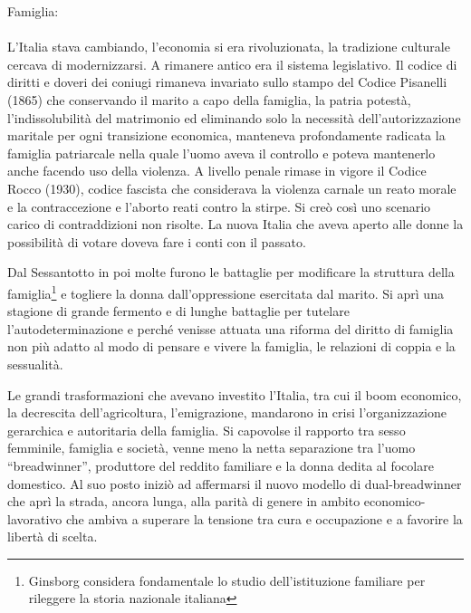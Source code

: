 Famiglia:\paragraph{} L'Italia stava cambiando, l'economia si era rivoluzionata, la tradizione culturale cercava di modernizzarsi.
A rimanere antico era il sistema legislativo.
Il codice di diritti e doveri dei coniugi rimaneva invariato sullo stampo del Codice Pisanelli (1865) che conservando il marito a capo della famiglia, la patria potestà, l'indissolubilità del matrimonio ed eliminando solo la necessità dell'autorizzazione maritale per ogni transizione economica, manteneva profondamente radicata la famiglia patriarcale nella quale l'uomo aveva il controllo e poteva mantenerlo anche facendo uso della violenza.
A livello penale rimase in vigore il Codice Rocco (1930), codice fascista che considerava la violenza carnale un reato morale e la contraccezione e l'aborto reati contro la stirpe.
Si creò così uno scenario carico di contraddizioni non risolte.
La nuova Italia che aveva aperto alle donne la possibilità di votare doveva fare i conti con il passato.

Dal Sessantotto in poi molte furono le battaglie per modificare la struttura della famiglia\footnote{Ginsborg considera fondamentale lo studio dell'istituzione familiare per rileggere la storia nazionale italiana} e togliere la donna dall'oppressione esercitata dal marito.
Si aprì una stagione di grande fermento e di lunghe battaglie per tutelare l'autodeterminazione e perché venisse attuata una riforma del diritto di famiglia non più adatto al modo di pensare e vivere la famiglia, le relazioni di coppia e la sessualità.

Le grandi trasformazioni che avevano investito l'Italia, tra cui il boom economico, la decrescita dell'agricoltura, l'emigrazione, mandarono in crisi l'organizzazione gerarchica e autoritaria della famiglia.
Si capovolse il rapporto tra sesso femminile, famiglia e società, venne meno la netta separazione tra l'uomo \enquote{breadwinner}, produttore del reddito familiare e la donna dedita al focolare domestico.
Al suo posto iniziò ad affermarsi il nuovo modello di dual-breadwinner che aprì la strada, ancora lunga, alla parità di genere in ambito economico-lavorativo che ambiva a superare la tensione tra cura e occupazione e a favorire la libertà di scelta.

